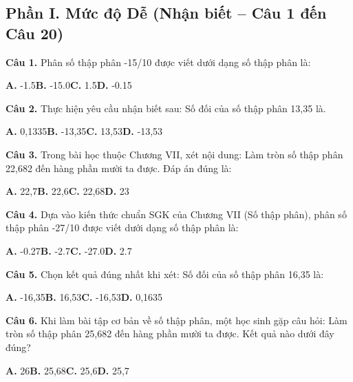 \documentclass[11pt,a4paper]{article}
\begin{document}
\subsection*{\color{accent} Phần I. Mức độ Dễ (Nhận biết -- Câu 1 đến Câu 20)}
\textbf{\color{primary} Câu 1.} Phân số thập phân -15/10 được viết dưới dạng số thập phân là:\par
\hspace*{1.5em}\textbf{A.} -1.5\quad\quad \textbf{B.} -15.0\quad\quad \textbf{C.} 1.5\quad\quad \textbf{D.} -0.15\par\vspace{2pt}
\textbf{\color{primary} Câu 2.} Thực hiện yêu cầu nhận biết sau: Số đối của số thập phân 13,35 là.\par
\hspace*{1.5em}\textbf{A.} 0,1335\quad\quad \textbf{B.} -13,35\quad\quad \textbf{C.} 13,53\quad\quad \textbf{D.} -13,53\par\vspace{2pt}
\textbf{\color{primary} Câu 3.} Trong bài học thuộc Chương VII, xét nội dung: Làm tròn số thập phân 22,682 đến hàng phần mười ta được. Đáp án đúng là:\par
\hspace*{1.5em}\textbf{A.} 22,7\quad\quad \textbf{B.} 22,6\quad\quad \textbf{C.} 22,68\quad\quad \textbf{D.} 23\par\vspace{2pt}
\textbf{\color{primary} Câu 4.} Dựa vào kiến thức chuẩn SGK của Chương VII (Số thập phân), phân số thập phân -27/10 được viết dưới dạng số thập phân là:\par
\hspace*{1.5em}\textbf{A.} -0.27\quad\quad \textbf{B.} -2.7\quad\quad \textbf{C.} -27.0\quad\quad \textbf{D.} 2.7\par\vspace{2pt}
\textbf{\color{primary} Câu 5.} Chọn kết quả đúng nhất khi xét: Số đối của số thập phân 16,35 là:\par
\hspace*{1.5em}\textbf{A.} -16,35\quad\quad \textbf{B.} 16,53\quad\quad \textbf{C.} -16,53\quad\quad \textbf{D.} 0,1635\par\vspace{2pt}
\textbf{\color{primary} Câu 6.} Khi làm bài tập cơ bản về số thập phân, một học sinh gặp câu hỏi: Làm tròn số thập phân 25,682 đến hàng phần mười ta được. Kết quả nào dưới đây đúng?\par
\hspace*{1.5em}\textbf{A.} 26\quad\quad \textbf{B.} 25,68\quad\quad \textbf{C.} 25,6\quad\quad \textbf{D.} 25,7\par\vspace{2pt}
\end{document}
